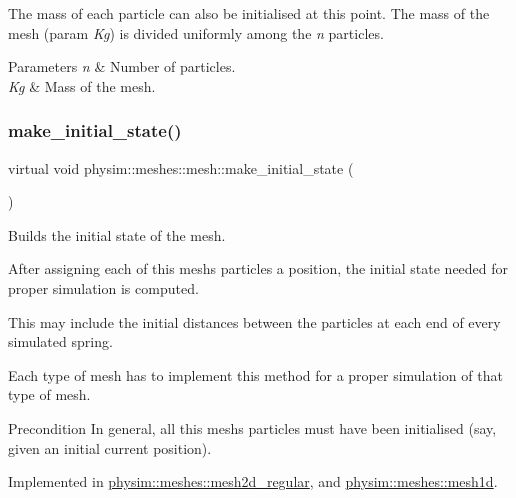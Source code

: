 The mass of each particle can also be initialised at this point. The mass of the mesh (param {\itshape Kg}) is divided uniformly among the {\itshape n} particles. 
\begin{DoxyParams}{Parameters}
{\em n} & Number of particles. \\
\hline
{\em Kg} & Mass of the mesh. \\
\hline
\end{DoxyParams}
\mbox{\label{classphysim_1_1meshes_1_1mesh_a62f877dd42bc306ef70c76fc172f245f}} 
\subsubsection{\texorpdfstring{make\+\_\+initial\+\_\+state()}{make\_initial\_state()}}
{\footnotesize\ttfamily virtual void physim\+::meshes\+::mesh\+::make\+\_\+initial\+\_\+state (\begin{DoxyParamCaption}{ }\end{DoxyParamCaption})\hspace{0.3cm}{\ttfamily [pure virtual]}}



Builds the initial state of the mesh. 

After assigning each of this mesh\textquotesingle{}s particles a position, the initial state needed for proper simulation is computed.

This may include the initial distances between the particles at each end of every simulated spring.

Each type of mesh has to implement this method for a proper simulation of that type of mesh. \begin{DoxyPrecond}{Precondition}
In general, all this mesh\textquotesingle{}s particles must have been initialised (say, given an initial current position). 
\end{DoxyPrecond}


Implemented in \hyperlink{classphysim_1_1meshes_1_1mesh2d__regular_ab05d404566850dd5a2d11814c3c25186}{physim\+::meshes\+::mesh2d\+\_\+regular}, and \hyperlink{classphysim_1_1meshes_1_1mesh1d_a6f2275fbab0ddfcbf523cc5a359e1d9c}{physim\+::meshes\+::mesh1d}.

\mbox{\label{classphysim_1_1meshes_1_1mesh_a8eabfe8ed4457f150a1f401ac116a3de}} 
